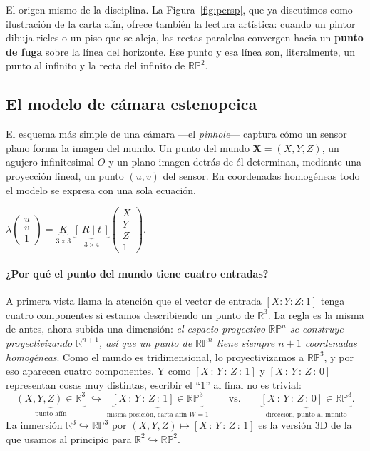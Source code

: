 \documentclass[11pt,a4paper]{article}
\newcommand{\RP}{\mathbb{RP}}
\newcommand{\R}{\mathbb{R}}
\newcommand{\hpf}[4]{[#1\,{:}\,#2\,{:}\,#3\,{:}\,#4]}
\begin{document}
El origen mismo de la disciplina. La Figura~\ref{fig:persp}, que ya
discutimos como ilustración de la carta afín, ofrece también la lectura
artística: cuando un pintor dibuja rieles o un piso que se aleja, las
rectas paralelas convergen hacia un \textbf{punto de fuga} sobre la línea
del horizonte. Ese punto y esa línea son, literalmente, un punto al
infinito y la recta del infinito de $\RP^2$.

\subsection{El modelo de cámara estenopeica}
\label{sec:camera}

El esquema más simple de una cámara —el \emph{pinhole}— captura cómo un
sensor plano forma la imagen del mundo. Un punto del mundo
$\mathbf{X}=(X,Y,Z)$, un agujero infinitesimal $O$ y un plano imagen
detrás de él determinan, mediante una proyección lineal, un punto
$(u,v)$ del sensor. En coordenadas homogéneas todo el modelo se expresa
con una sola ecuación.

\begin{teorema}
\centering\large
$\displaystyle \lambda
\begin{pmatrix} u\\ v\\ 1\end{pmatrix}
=
\underbrace{K}_{3\times 3}
\;
\underbrace{[\,R\mid t\,]}_{3\times 4}
\begin{pmatrix} X\\ Y\\ Z\\ 1\end{pmatrix}.$
\end{teorema}

\paragraph{¿Por qué el punto del mundo tiene cuatro entradas?}
A primera vista llama la atención que el vector de entrada
$[X:Y:Z:1]$ tenga cuatro componentes si estamos describiendo un punto
de $\R^3$. La regla es la misma de antes, ahora subida una dimensión:
\emph{el espacio proyectivo $\RP^n$ se construye proyectivizando
$\R^{n+1}$, así que un punto de $\RP^n$ tiene siempre $n+1$ coordenadas
homogéneas}. Como el mundo es tridimensional, lo proyectivizamos a
$\RP^3$, y por eso aparecen cuatro componentes. Y como
$\hpf{X}{Y}{Z}{1}$ y $\hpf{X}{Y}{Z}{0}$ representan cosas muy distintas,
escribir el ``$1$'' al final no es trivial:
\[
  \underbrace{(X,Y,Z)\in\R^3}_{\text{punto afín}}
  \;\hookrightarrow\;
  \underbrace{\hpf{X}{Y}{Z}{1}\in\RP^{3}}_{\text{misma posición, carta afín }W=1}
  \qquad\text{vs.}\qquad
  \underbrace{\hpf{X}{Y}{Z}{0}\in\RP^{3}}_{\text{dirección, punto al infinito}}.
\]
La inmersión $\R^3\hookrightarrow\RP^3$ por $(X,Y,Z)\mapsto\hpf{X}{Y}{Z}{1}$
es la versión 3D de la que usamos al principio para $\R^2\hookrightarrow\RP^2$.
\end{document}
